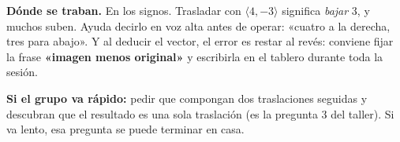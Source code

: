 \documentclass[11pt]{article}
\begin{document}
\begin{nota}
\textbf{Dónde se traban.} En los signos. Trasladar con $\langle 4, -3\rangle$ significa
\emph{bajar} 3, y muchos suben. Ayuda decirlo en voz alta antes de operar: «cuatro a la
derecha, tres para abajo». Y al deducir el vector, el error es restar al revés: conviene fijar
la frase \textbf{«imagen menos original»} y escribirla en el tablero durante toda la sesión.
\end{nota}

\begin{nota}
\textbf{Si el grupo va rápido:} pedir que compongan dos traslaciones seguidas y descubran que
el resultado es una sola traslación (es la pregunta 3 del taller). Si va lento, esa pregunta se
puede terminar en casa.
\end{nota}
\end{document}
